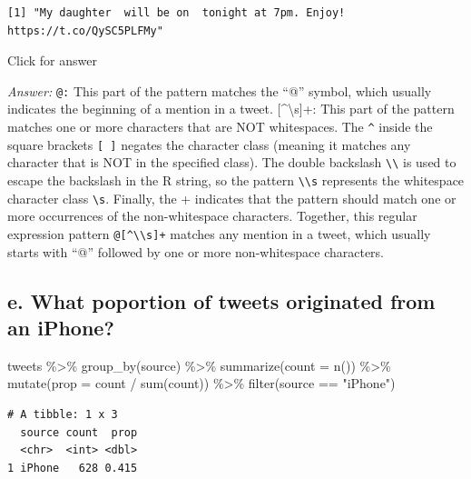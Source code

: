 \documentclass[
]{book}
\newenvironment{Shaded}{\begin{snugshade}}{\end{snugshade}}
\newcommand{\AttributeTok}[1]{\textcolor[rgb]{0.77,0.63,0.00}{#1}}
\newcommand{\FunctionTok}[1]{\textcolor[rgb]{0.00,0.00,0.00}{#1}}
\newcommand{\NormalTok}[1]{#1}
\newcommand{\SpecialCharTok}[1]{\textcolor[rgb]{0.00,0.00,0.00}{#1}}
\newcommand{\StringTok}[1]{\textcolor[rgb]{0.31,0.60,0.02}{#1}}
\begin{document}
\begin{verbatim}
[1] "My daughter  will be on  tonight at 7pm. Enjoy! https://t.co/QySC5PLFMy"
\end{verbatim}

Click for answer

\emph{Answer:} \texttt{@:} This part of the pattern matches the ``@'' symbol, which usually indicates the beginning of a mention in a tweet.
{[}\^{}\textbackslash s{]}+: This part of the pattern matches one or more characters that are NOT whitespaces. The \texttt{\^{}} inside the square brackets \texttt{{[}\ {]}} negates the character class (meaning it matches any character that is NOT in the specified class). The double backslash \texttt{\textbackslash{}\textbackslash{}} is used to escape the backslash in the R string, so the pattern \texttt{\textbackslash{}\textbackslash{}s} represents the whitespace character class \texttt{\textbackslash{}s}. Finally, the + indicates that the pattern should match one or more occurrences of the non-whitespace characters. Together, this regular expression pattern \texttt{@{[}\^{}\textbackslash{}\textbackslash{}s{]}+} matches any mention in a tweet, which usually starts with ``@'' followed by one or more non-whitespace characters.

\hypertarget{e.-what-poportion-of-tweets-originated-from-an-iphone}{%
\subsection{e. What poportion of tweets originated from an iPhone?}\label{e.-what-poportion-of-tweets-originated-from-an-iphone}}

\begin{Shaded}
\begin{Highlighting}[]
\NormalTok{tweets }\SpecialCharTok{\%\textgreater{}\%} \FunctionTok{group\_by}\NormalTok{(source) }\SpecialCharTok{\%\textgreater{}\%} \FunctionTok{summarize}\NormalTok{(}\AttributeTok{count =} \FunctionTok{n}\NormalTok{()) }\SpecialCharTok{\%\textgreater{}\%}
  \FunctionTok{mutate}\NormalTok{(}\AttributeTok{prop =}\NormalTok{ count }\SpecialCharTok{/} \FunctionTok{sum}\NormalTok{(count)) }\SpecialCharTok{\%\textgreater{}\%}  \FunctionTok{filter}\NormalTok{(source }\SpecialCharTok{==} \StringTok{"iPhone"}\NormalTok{)}
\end{Highlighting}
\end{Shaded}

\begin{verbatim}
# A tibble: 1 x 3
  source count  prop
  <chr>  <int> <dbl>
1 iPhone   628 0.415
\end{verbatim}
\end{document}
